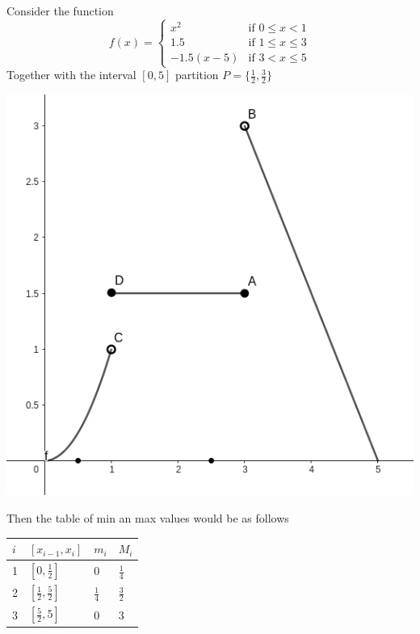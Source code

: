 \documentclass{report}
\begin{document}

    \begin{Example}
        Consider the function $$f(x) =
        \begin{cases}
        x^2 & \text{if } 0 \leq x < 1 \\
        1.5 & \text{if } 1 \leq x \leq 3 \\
        -1.5(x-5) & \text{if } 3 < x \leq 5
        \end{cases}$$
        Together with the interval $[0, 5]$ partition $P = \{\frac{1}{2}, \frac{3}{2}\}$

        \begin{center}
            \includegraphics[width=.5\textwidth]{images/minmax.png}
        \end{center}

        Then the table of min an max values would be as follows

        \begin{center}
            \begin{table}[h]
                \begin{tabular}{l|l|l|l}
                $i$ & $[x_{i-1}, x_i]$             & $m_i$         & $M_i$         \\ \hline
                1   & $[0, \frac{1}{2}]$           & 0             & $\frac{1}{4}$ \\
                2   & $[\frac{1}{2}, \frac{5}{2}]$ & $\frac{1}{4}$ & $\frac{3}{2}$ \\
                3   & $[\frac{5}{2}, 5]$           & 0             & 3
                \end{tabular}
            \end{table}
        \end{center}

    \end{Example}
\end{document}
